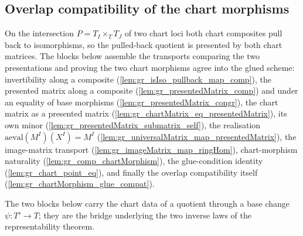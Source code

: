 \subsection{Overlap compatibility of the chart morphisms}

On the intersection \(P = T_I \times_T T_J\) of two chart loci both chart composites pull
back to isomorphisms, so the pulled-back quotient is presented by both chart matrices. The
blocks below assemble the transports comparing the two presentations and proving the two
chart morphisms agree into the glued scheme: invertibility along a composite
(\cref{lem:gr_isIso_pullback_map_comp}), the presented matrix along a composite
(\cref{lem:gr_presentedMatrix_comp}) and under an equality of base morphisms
(\cref{lem:gr_presentedMatrix_congr}), the chart matrix as a presented matrix
(\cref{lem:gr_chartMatrix_eq_presentedMatrix}), its own minor
(\cref{lem:gr_presentedMatrix_submatrix_self}), the realisation
\(\mathrm{aeval}(M^I)(X^I) = M^I\) (\cref{lem:gr_universalMatrix_map_presentedMatrix}), the
image-matrix transport (\cref{lem:gr_imageMatrix_map_ringHom}), chart-morphism naturality
(\cref{lem:gr_comp_chartMorphism}), the glue-condition identity
(\cref{lem:gr_chart_point_eq}), and finally the overlap compatibility itself
(\cref{lem:gr_chartMorphism_glue_compat}).


The two blocks below carry the chart data of a quotient through a base change
\(\psi : T' \to T\); they are the bridge underlying the two inverse laws of the
representability theorem.


